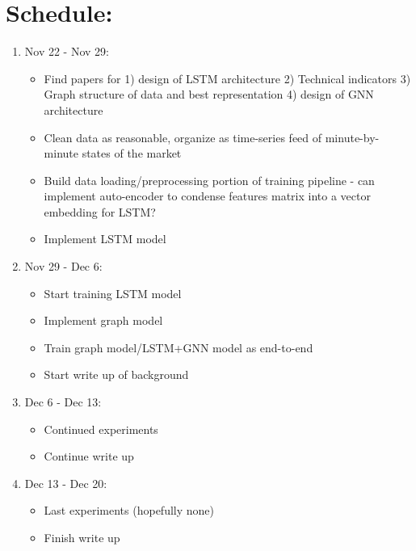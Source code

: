 \documentclass[12pt]{article}
\begin{document}
\newpage

\section*{Schedule:}

\begin{enumerate}
  \item Nov 22 - Nov 29:
    \begin{itemize}
      \item Find papers for 1) design of LSTM architecture 2) Technical indicators 3) Graph structure of data and best representation 4) design of GNN architecture
      \item Clean data as reasonable, organize as time-series feed of minute-by-minute states of the market
      \item Build data loading/preprocessing portion of training pipeline - can implement auto-encoder to condense features matrix into a vector embedding for LSTM?
      \item Implement LSTM model
    \end{itemize}
  \item Nov 29 - Dec 6:
    \begin{itemize}
      \item Start training LSTM model
      \item Implement graph model
      \item Train graph model/LSTM+GNN model as end-to-end
      \item Start write up of background
    \end{itemize}
  \item Dec 6 - Dec 13:
    \begin{itemize}
      \item Continued experiments
      \item Continue write up
    \end{itemize}
  \item Dec 13 - Dec 20: 
    \begin{itemize}
      \item Last experiments (hopefully none)
      \item Finish write up
    \end{itemize}
\end{enumerate}
\end{document}
